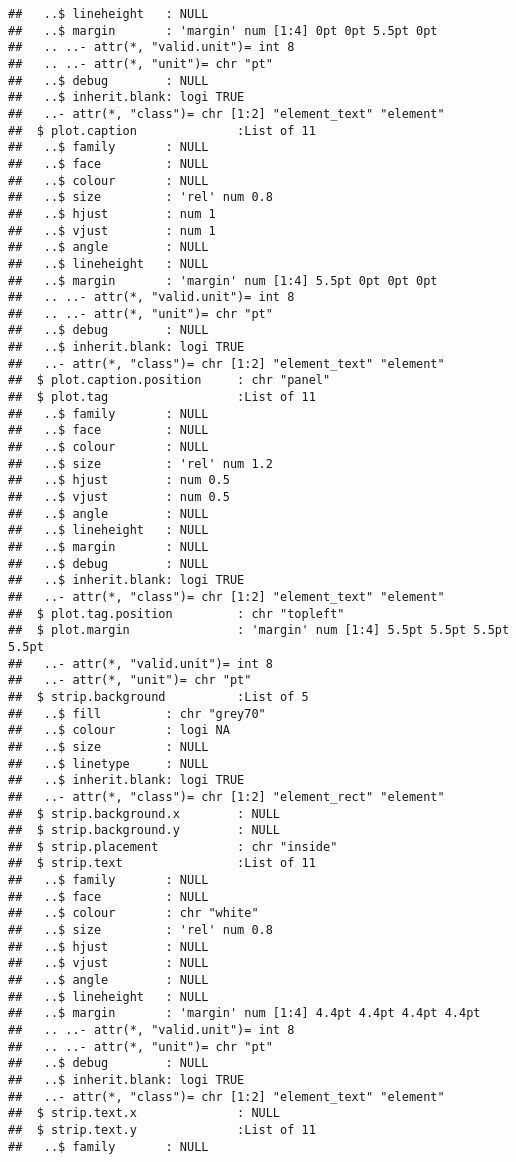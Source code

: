 \documentclass[]{article}
\begin{document}
\begin{verbatim}
##   ..$ lineheight   : NULL
##   ..$ margin       : 'margin' num [1:4] 0pt 0pt 5.5pt 0pt
##   .. ..- attr(*, "valid.unit")= int 8
##   .. ..- attr(*, "unit")= chr "pt"
##   ..$ debug        : NULL
##   ..$ inherit.blank: logi TRUE
##   ..- attr(*, "class")= chr [1:2] "element_text" "element"
##  $ plot.caption              :List of 11
##   ..$ family       : NULL
##   ..$ face         : NULL
##   ..$ colour       : NULL
##   ..$ size         : 'rel' num 0.8
##   ..$ hjust        : num 1
##   ..$ vjust        : num 1
##   ..$ angle        : NULL
##   ..$ lineheight   : NULL
##   ..$ margin       : 'margin' num [1:4] 5.5pt 0pt 0pt 0pt
##   .. ..- attr(*, "valid.unit")= int 8
##   .. ..- attr(*, "unit")= chr "pt"
##   ..$ debug        : NULL
##   ..$ inherit.blank: logi TRUE
##   ..- attr(*, "class")= chr [1:2] "element_text" "element"
##  $ plot.caption.position     : chr "panel"
##  $ plot.tag                  :List of 11
##   ..$ family       : NULL
##   ..$ face         : NULL
##   ..$ colour       : NULL
##   ..$ size         : 'rel' num 1.2
##   ..$ hjust        : num 0.5
##   ..$ vjust        : num 0.5
##   ..$ angle        : NULL
##   ..$ lineheight   : NULL
##   ..$ margin       : NULL
##   ..$ debug        : NULL
##   ..$ inherit.blank: logi TRUE
##   ..- attr(*, "class")= chr [1:2] "element_text" "element"
##  $ plot.tag.position         : chr "topleft"
##  $ plot.margin               : 'margin' num [1:4] 5.5pt 5.5pt 5.5pt 5.5pt
##   ..- attr(*, "valid.unit")= int 8
##   ..- attr(*, "unit")= chr "pt"
##  $ strip.background          :List of 5
##   ..$ fill         : chr "grey70"
##   ..$ colour       : logi NA
##   ..$ size         : NULL
##   ..$ linetype     : NULL
##   ..$ inherit.blank: logi TRUE
##   ..- attr(*, "class")= chr [1:2] "element_rect" "element"
##  $ strip.background.x        : NULL
##  $ strip.background.y        : NULL
##  $ strip.placement           : chr "inside"
##  $ strip.text                :List of 11
##   ..$ family       : NULL
##   ..$ face         : NULL
##   ..$ colour       : chr "white"
##   ..$ size         : 'rel' num 0.8
##   ..$ hjust        : NULL
##   ..$ vjust        : NULL
##   ..$ angle        : NULL
##   ..$ lineheight   : NULL
##   ..$ margin       : 'margin' num [1:4] 4.4pt 4.4pt 4.4pt 4.4pt
##   .. ..- attr(*, "valid.unit")= int 8
##   .. ..- attr(*, "unit")= chr "pt"
##   ..$ debug        : NULL
##   ..$ inherit.blank: logi TRUE
##   ..- attr(*, "class")= chr [1:2] "element_text" "element"
##  $ strip.text.x              : NULL
##  $ strip.text.y              :List of 11
##   ..$ family       : NULL

\end{verbatim}
\end{document}
